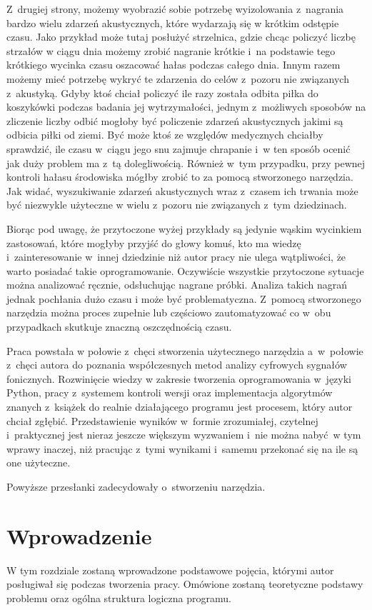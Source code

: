 \documentclass[eng,printmode]{mgr}
\begin{document}
Z~drugiej strony, możemy wyobrazić sobie potrzebę wyizolowania z~nagrania bardzo wielu zdarzeń akustycznych, które wydarzają się w krótkim odstępie czasu. Jako przykład może tutaj posłużyć strzelnica, gdzie chcąc policzyć liczbę strzałów w ciągu dnia możemy zrobić nagranie krótkie i~na podstawie tego krótkiego wycinka czasu oszacować hałas podczas całego dnia. Innym razem możemy mieć potrzebę wykryć te zdarzenia do celów z~pozoru nie związanych z~akustyką. Gdyby ktoś chciał policzyć ile razy została odbita piłka do koszykówki podczas badania jej wytrzymałości, jednym z~możliwych sposobów na zliczenie liczby odbić mogłoby być policzenie zdarzeń akustycznych jakimi są odbicia piłki od ziemi. Być może ktoś ze względów medycznych chciałby sprawdzić, ile czasu w~ciągu jego snu zajmuje chrapanie i~w ten sposób ocenić jak duży problem ma z~tą dolegliwością. Również w~tym przypadku, przy pewnej kontroli hałasu środowiska mógłby zrobić to za pomocą stworzonego narzędzia. Jak widać, wyszukiwanie zdarzeń akustycznych wraz z~czasem ich trwania może być niezwykle użyteczne w wielu z~pozoru nie związanych z~tym dziedzinach. 

Biorąc pod uwagę, że przytoczone wyżej przykłady są jedynie wąskim wycinkiem zastosowań, które mogłyby przyjść do głowy komuś, kto ma wiedzę i~zainteresowanie w~innej dziedzinie niż autor pracy nie ulega wątpliwości, że warto posiadać takie oprogramowanie. Oczywiście wszystkie przytoczone sytuacje można analizować ręcznie, odsłuchując nagrane próbki. Analiza takich nagrań jednak pochłania dużo czasu i może być problematyczna. Z~pomocą stworzonego narzędzia można proces zupełnie lub częściowo zautomatyzować co w~obu przypadkach skutkuje znaczną oszczędnością czasu. 

Praca powstała w połowie z~chęci stworzenia użytecznego narzędzia a~w~połowie z~chęci autora do poznania współczesnych metod analizy cyfrowych sygnałów fonicznych. Rozwinięcie wiedzy w zakresie tworzenia oprogramowania w~języki Python, pracy z~systemem kontroli wersji oraz implementacja algorytmów znanych z~książek do realnie działającego programu jest procesem, który autor chciał zgłębić. Przedstawienie wyników w~formie zrozumiałej, czytelnej i~praktycznej jest nieraz jeszcze większym wyzwaniem i~nie można nabyć~w tym wprawy inaczej, niż pracując z~tymi wynikami i~samemu przekonać się na ile są one użyteczne.

Powyższe przesłanki zadecydowały o~stworzeniu narzędzia. 

\chapter{Wprowadzenie} \label{wprowadzenie}
W tym rozdziale zostaną wprowadzone podstawowe pojęcia, którymi autor posługiwał się podczas tworzenia pracy. Omówione zostaną teoretyczne podstawy problemu oraz ogólna struktura logiczna programu.
\end{document}
